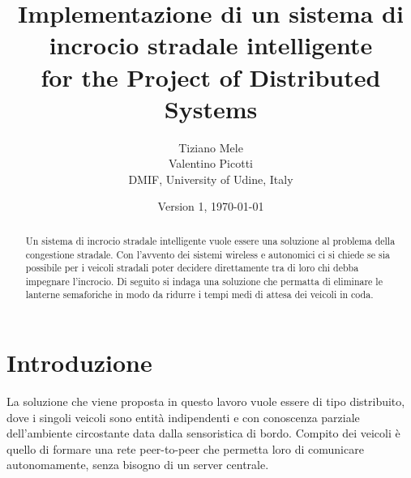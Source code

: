 \documentclass{memoir}
\title{Implementazione di un sistema di incrocio stradale intelligente \\ for the Project of Distributed Systems}
\author{Tiziano Mele\\Valentino Picotti\\DMIF, University of Udine, Italy}
\date{Version 1, \today}
\begin{document}
\maketitle
\begin{abstract}
  Un sistema di incrocio stradale intelligente vuole essere una soluzione al
  problema della congestione stradale. Con l'avvento dei sistemi wireless e
  autonomici ci si chiede se sia possibile per i veicoli stradali poter decidere
  direttamente tra di loro chi debba impegnare l'incrocio. Di seguito si indaga
  una soluzione che permatta di eliminare le lanterne semaforiche in modo da
  ridurre i tempi medi di attesa dei veicoli in coda.
\end{abstract}

\chapter{Introduzione}\label{ch:intro}

La soluzione che viene proposta in questo lavoro vuole essere di tipo
distribuito, dove i singoli veicoli sono entità indipendenti e con conoscenza
parziale dell'ambiente circostante data dalla sensoristica di bordo. Compito dei
veicoli è quello di formare una rete peer-to-peer che permetta loro di
comunicare autonomamente, senza bisogno di un server centrale.

\end{document}
